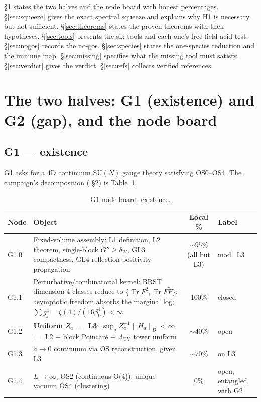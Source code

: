 \S\ref{sec:halves} states the two halves and the node board with honest percentages.
\S\ref{sec:squeeze} gives the exact spectral squeeze and explains why H1 is necessary but not
sufficient. \S\ref{sec:theorems} states the proven theorems with their hypotheses.
\S\ref{sec:tools} presents the six tools and each one's free-field acid test.
\S\ref{sec:nogos} records the no-gos. \S\ref{sec:species} states the one-species reduction and
the immune map. \S\ref{sec:missing} specifies what the missing tool must satisfy.
\S\ref{sec:verdict} gives the verdict. \S\ref{sec:refs} collects verified references.

\section{The two halves: G1 (existence) and G2 (gap), and the node board}
\label{sec:halves}

\subsection{G1 --- existence}

G1 asks for a 4D continuum $\mathrm{SU}(N)$ gauge theory satisfying OS0--OS4. The campaign's
decomposition ( \S2) is Table~\ref{tab:g1}.

\begin{table}[t]
\centering
\begin{tabularx}{\textwidth}{@{}l>{\raggedright\arraybackslash}Xc>{\raggedright\arraybackslash}p{3.1cm}@{}}
\toprule
\textbf{Node} & \textbf{Object} & \textbf{Local \%} & \textbf{Label}\\
\midrule
G1.0 & Fixed-volume assembly: L1 definition, L2 theorem, single-block $G''\ge\delta_W$,
  GL3 compactness, GL4 reflection-positivity propagation & $\sim95\%$ (all but L3) & \LT{} mod.\ L3\\
G1.1 & Perturbative/combinatorial kernel: BRST dimension-4 classes reduce to
  $\{\operatorname{Tr}F^2,\operatorname{Tr}F\tilde F\}$; asymptotic freedom absorbs the marginal
  log; $\sum g_j^4=\zeta(4)/(16\beta_0^4)<\infty$ & 100\% & \LT{} closed\\
G1.2 & \textbf{Uniform $Z_a$ $=$ L3}: $\sup_a Z_a^{-1}\|H_a\|_D<\infty$ $=$ L2 $+$ block
  Poincaré $+$ $\Lambda_{\mathrm{UV}}$ tower uniform & $\sim40\%$ & \LM{} open\\
G1.3 & $a\to0$ continuum via OS reconstruction, given L3 & $\sim70\%$ & \LC{} on L3\\
G1.4 & $L\to\infty$, OS2 (continuous O(4)), unique vacuum OS4 (clustering) & 0\% &
  \LM{} open, entangled with G2\\
\bottomrule
\end{tabularx}
\caption{G1 node board: existence.}
\label{tab:g1}
\end{table}

